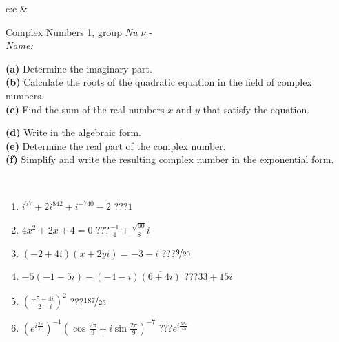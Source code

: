 \documentclass[10pt]{report}
\begin{document}
\begin{tabular}{c:c}
&
\begin{minipage}[c][104.5mm][t]{0.5\linewidth}
\begin{center}
\vspace{5mm}
{\huge Complex Numbers 1, group \textit{Nu $\nu$} -}\\[5mm]
\textit{Name:}\phantom{xxxxxxxxxxxxxxxxxxxxxxxxxxxxxxxxxxxxxxxxxxxxxxxxxxxxxxxxxxxxxxxxx}\\[5mm]
\begin{minipage}{0.95\linewidth}
\begin{center}
{\small \begin{minipage}{0.44\textwidth} \raggedright
\textbf{(a)} Determine the imaginary part. \\[1mm]
\textbf{(b)} Calculate the roots of the quadratic equation in the field of complex numbers. \\[1mm]
\textbf{(c)} Find the sum of the real numbers \(x\) and \(y\) that satisfy the equation. \end{minipage} \begin{minipage}{0.54\textwidth}
\textbf{(d)} Write in the algebraic form. \\[1mm]
\textbf{(e)} Determine the real part of the complex number. \\[1mm]
\textbf{(f)} Simplify and write the resulting complex number in the exponential form.
\end{minipage}
} \vspace{3mm}
\end{center}
\end{minipage}
\\[1mm]
\begin{minipage}{0.79\linewidth}
\begin{center}
\begin{varwidth}{\linewidth}
\setlength{\itemsep}{0pt}
\begin{enumerate}
\large
\item $i^{77}+2i^{842}+i^{-740}-2$\quad \dotfill\; ???\;\dotfill \quad $1$
\item $4x^2+2x+4=0$\quad \dotfill\; ???\;\dotfill \quad $\frac{-1}{4} \pm{}\frac{ \sqrt{60}}{8}i$
\item $(-2+4i)(x+2yi)=-3-i$\quad \dotfill\; ???\;\dotfill \quad $\nicefrac{9}{20}$
\item $-5(-1-5i)-(-4-i)\overline{(6+4i)}$\quad \dotfill\; ???\;\dotfill \quad $33+15i$
\item $\left(\frac{-5-4i}{-2-i}\right)^2$\quad \dotfill\; ???\;\dotfill \quad $\nicefrac{187}{25}$
\item $\left(e^{i\frac{2\pi}{5}}\right)^{-1}\left(\cos{\frac{2\pi}{9}}+i\sin{\frac{2\pi}{9}}\right)^{-7}$\quad \dotfill\; ???\;\dotfill \quad $e^{i\frac{52\pi}{45}}$

\end{enumerate}
\end{varwidth}
\end{center}
\end{minipage}
\end{center}
\end{minipage}
\end{tabular}
\end{document}
